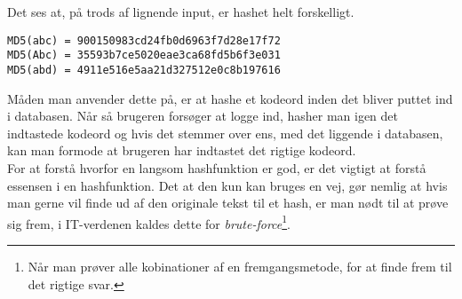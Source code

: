 \begin{eks}
    \label{eks:hash}
    Det ses at, på trods af lignende input, er hashet helt forskelligt.
    \begin{center}
        \texttt{MD5(abc) = 900150983cd24fb0d6963f7d28e17f72}\\
        \texttt{MD5(Abc) = 35593b7ce5020eae3ca68fd5b6f3e031}\\
        \texttt{MD5(abd) = 4911e516e5aa21d327512e0c8b197616}\\
    \end{center}
\end{eks}

\noindent
Måden man anvender dette på, er at hashe et kodeord inden det bliver puttet ind i databasen.
Når så brugeren forsøger at logge ind, hasher man igen det indtastede kodeord og hvis det stemmer over ens, med det liggende i databasen, kan man formode at brugeren har indtastet det rigtige kodeord.
\\

For at forstå hvorfor en langsom hashfunktion er god, er det vigtigt at forstå essensen i en hashfunktion.
Det at den kun kan bruges en vej, gør nemlig at hvis man gerne vil finde ud af den originale tekst til et hash, er man nødt til at prøve sig frem, i IT-verdenen kaldes dette for \emph{brute-force}\footnote{Når man prøver alle kobinationer af en fremgangsmetode, for at finde frem til det rigtige svar.}.


